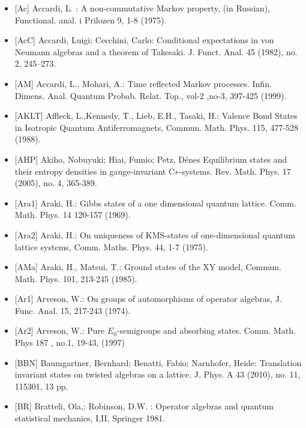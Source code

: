 \documentclass[a4paper,Haag duality]{mathscan}
\theoremstyle{definition}
\begin{document}
\begin{itemize} 
\bigskip
\item{[Ac]} Accardi, L. : A non-commutative Markov property, (in Russian), Functional.  anal. i Prilozen 9, 1-8 (1975).

\item{[AcC]} Accardi, Luigi; Cecchini, Carlo: Conditional expectations in von Neumann algebras and a theorem of Takesaki.
J. Funct. Anal. 45 (1982), no. 2, 245–273. 

\item{[AM]} Accardi, L., Mohari, A.: Time reflected
Markov processes. Infin. Dimens. Anal. Quantum Probab. Relat. Top., vol-2
,no-3, 397-425 (1999).

\item{[AKLT]} Affleck, L.,Kennedy, T., Lieb, E.H., Tasaki, H.: Valence Bond States in Isotropic Quantum Antiferromagnets, Commun. Math. Phys. 115, 477-528 (1988). 

\item{[AHP]} Akiho, Nobuyuki; Hiai, Fumio; Petz, Dénes Equilibrium states and their entropy densities in gauge-invariant C∗-systems. Rev. Math. Phys. 17 (2005), 
no. 4, 365-389.

\item{[Ara1]} Araki, H.:  Gibbs states of a one dimensional quantum lattice. Comm. Math. Phys. 14 120-157 (1969). 

\item{[Ara2]} Araki, H.: On uniqueness of KMS-states of one-dimensional quantum lattice systems, Comm. Maths. Phys. 44, 1-7 (1975).

\item{[AMa]} Araki, H., Matsui, T.: Ground states of the XY model, Commun. Math. Phys. 101, 213-245 (1985).

\item{[Ar1]} Arveson, W.: On groups of automorphisms of operator algebras, J. Func. Anal. 15, 217-243 (1974).

\item{[Ar2]} Arveson, W.: Pure $E_0$-semigroups and absorbing states. 
Comm. Math. Phys 187 , no.1, 19-43, (1997)

\item{[BBN]} Baumgartner, Bernhard; Benatti, Fabio; Narnhofer, Heide: Translation invariant states on twisted algebras on a lattice. J. Phys. A 43 (2010), no. 11, 115301, 13 pp. 

\item{[BR]} Bratteli, Ola,: Robinson, D.W. : Operator algebras
and quantum statistical mechanics, I,II, Springer 1981.


\end{itemize}
\end{document}
